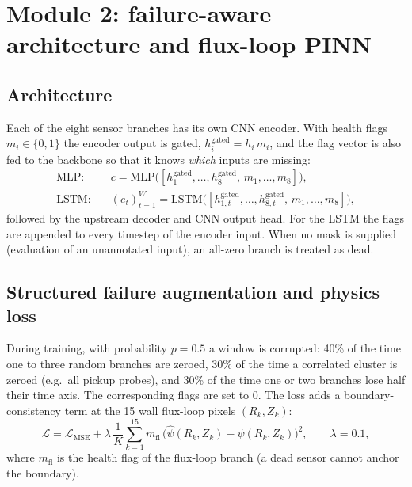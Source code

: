 \documentclass[11pt,a4paper]{article}
\newcommand{\psihat}{\hat{\psi}}
\begin{document}
\section{Module 2: failure-aware architecture and flux-loop PINN}\label{sec:m2}

\subsection{Architecture}
Each of the eight sensor branches has its own CNN encoder. With health flags $m_i\in\{0,1\}$ the encoder output is gated,
$h_i^{\text{gated}}=h_i\,m_i$, and the flag vector is also fed to the backbone so that it knows \emph{which} inputs are missing:
\begin{align}
\text{MLP:}\quad & c=\mathrm{MLP}\big([h_1^{\text{gated}},\dots,h_8^{\text{gated}},\,m_1,\dots,m_8]\big),\\
\text{LSTM:}\quad & (e_t)_{t=1}^{W}=\mathrm{LSTM}\big([h_{1,t}^{\text{gated}},\dots,h_{8,t}^{\text{gated}},\,m_1,\dots,m_8]\big),
\end{align}
followed by the upstream decoder and CNN output head. For the LSTM the flags are appended to every timestep of the encoder
input. When no mask is supplied (evaluation of an unannotated input), an all-zero branch is treated as dead.

\subsection{Structured failure augmentation and physics loss}
During training, with probability $p=0.5$ a window is corrupted: 40\% of the time one to three random branches are zeroed,
30\% of the time a correlated cluster is zeroed (e.g.\ all pickup probes), and 30\% of the time one or two branches lose half
their time axis. The corresponding flags are set to $0$. The loss adds a boundary-consistency term at the 15 wall flux-loop
pixels $(R_k,Z_k)$:
\begin{equation}
\mathcal L=\mathcal L_{\text{MSE}}+\lambda\,\frac1K\sum_{k=1}^{15} m_{\mathrm{fl}}\,\big(\psihat(R_k,Z_k)-\psi(R_k,Z_k)\big)^2,\qquad \lambda=0.1,
\end{equation}
where $m_{\mathrm{fl}}$ is the health flag of the flux-loop branch (a dead sensor cannot anchor the boundary).
\end{document}
